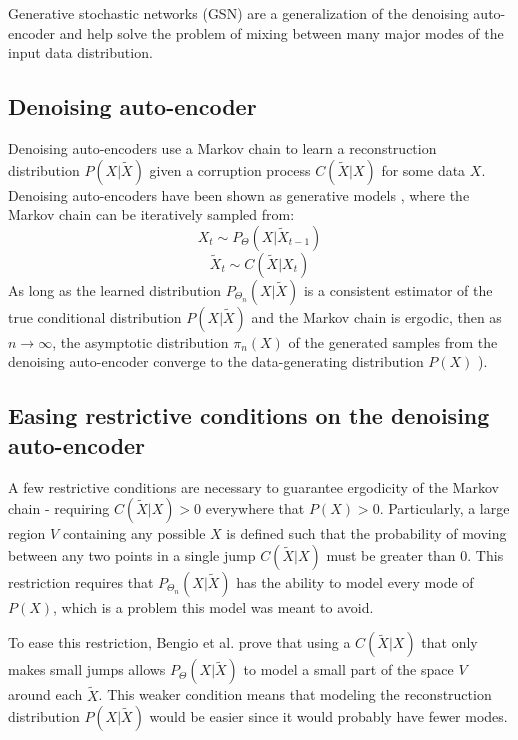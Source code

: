 Generative stochastic networks (GSN) are a generalization of the denoising auto-encoder and help solve the problem of mixing between many major modes of the input data distribution.

\subsection{Denoising auto-encoder}
Denoising auto-encoders use a Markov chain to learn a reconstruction distribution \(P(X|\widetilde{X})\) given a corruption process \(C(\widetilde{X}|X)\) for some data \(X\). Denoising auto-encoders have been shown as generative models \cite{bengio13a}, where the Markov chain can be iteratively sampled from:
\begin{equation}
	X_t \sim P_\Theta(X|\widetilde{X}_{t-1})
\end{equation}
\begin{equation}
	\widetilde{X}_t \sim C(\widetilde{X}|X_t)
\end{equation}
As long as the learned distribution \(P_{\Theta_n}(X|\widetilde{X})\) is a consistent estimator of the true conditional distribution \(P(X|\widetilde{X})\) and the Markov chain is ergodic, then as \(n \rightarrow \infty\), the asymptotic distribution \(\pi_n(X)\) of the generated samples from the denoising auto-encoder converge to the data-generating distribution \(P(X)\) \cite{bengio13a}). 


\subsection{Easing restrictive conditions on the denoising auto-encoder}

A few restrictive conditions are necessary to guarantee ergodicity of the Markov chain - requiring \(C(\widetilde{X}|X) > 0\) everywhere that \(P(X) > 0\). Particularly, a large region \(V\) containing any possible \(X\) is defined such that the probability of moving between any two points in a single jump \(C(\widetilde{X}|X)\) must be greater than 0. This restriction requires that \(P_{\Theta_n}(X|\widetilde{X})\) has the ability to model every mode of \(P(X)\), which is a problem this model was meant to avoid.

To ease this restriction, Bengio et al. \cite{gsn} prove that using a \(C(\widetilde{X}|X)\) that only makes small jumps allows \(P_{\Theta}(X|\widetilde{X})\) to model a small part of the space \(V\) around each \(\widetilde{X}\). This weaker condition means that modeling the reconstruction distribution \(P(X|\widetilde{X})\) would be easier since it would probably have fewer modes. 

